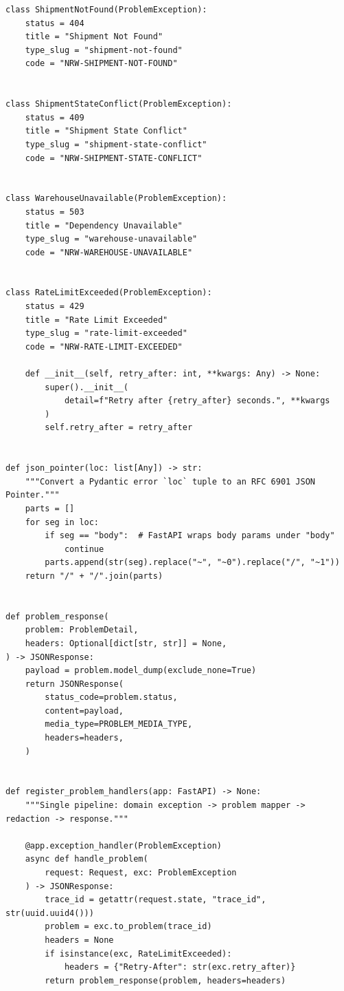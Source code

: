 \begin{verbatim}
class ShipmentNotFound(ProblemException):
    status = 404
    title = "Shipment Not Found"
    type_slug = "shipment-not-found"
    code = "NRW-SHIPMENT-NOT-FOUND"


class ShipmentStateConflict(ProblemException):
    status = 409
    title = "Shipment State Conflict"
    type_slug = "shipment-state-conflict"
    code = "NRW-SHIPMENT-STATE-CONFLICT"


class WarehouseUnavailable(ProblemException):
    status = 503
    title = "Dependency Unavailable"
    type_slug = "warehouse-unavailable"
    code = "NRW-WAREHOUSE-UNAVAILABLE"


class RateLimitExceeded(ProblemException):
    status = 429
    title = "Rate Limit Exceeded"
    type_slug = "rate-limit-exceeded"
    code = "NRW-RATE-LIMIT-EXCEEDED"

    def __init__(self, retry_after: int, **kwargs: Any) -> None:
        super().__init__(
            detail=f"Retry after {retry_after} seconds.", **kwargs
        )
        self.retry_after = retry_after


def json_pointer(loc: list[Any]) -> str:
    """Convert a Pydantic error `loc` tuple to an RFC 6901 JSON Pointer."""
    parts = []
    for seg in loc:
        if seg == "body":  # FastAPI wraps body params under "body"
            continue
        parts.append(str(seg).replace("~", "~0").replace("/", "~1"))
    return "/" + "/".join(parts)


def problem_response(
    problem: ProblemDetail,
    headers: Optional[dict[str, str]] = None,
) -> JSONResponse:
    payload = problem.model_dump(exclude_none=True)
    return JSONResponse(
        status_code=problem.status,
        content=payload,
        media_type=PROBLEM_MEDIA_TYPE,
        headers=headers,
    )


def register_problem_handlers(app: FastAPI) -> None:
    """Single pipeline: domain exception -> problem mapper -> redaction -> response."""

    @app.exception_handler(ProblemException)
    async def handle_problem(
        request: Request, exc: ProblemException
    ) -> JSONResponse:
        trace_id = getattr(request.state, "trace_id", str(uuid.uuid4()))
        problem = exc.to_problem(trace_id)
        headers = None
        if isinstance(exc, RateLimitExceeded):
            headers = {"Retry-After": str(exc.retry_after)}
        return problem_response(problem, headers=headers)


\end{verbatim}
